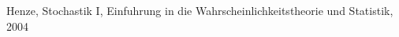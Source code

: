 \begin{thebibliography}{1cm}
 Henze, Stochastik I, Einfuhrung in die Wahrscheinlichkeitstheorie und Statistik, 2004
\end{thebibliography}